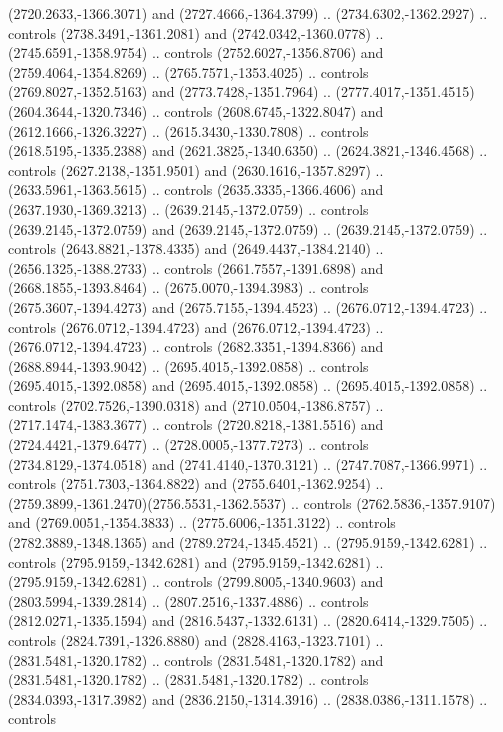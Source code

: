 \begin{scope}[shift={(28.3138,-376.6591)}]
\begin{scope}[shift={(-2186.6262,1813.8454)}]
      (2720.2633,-1366.3071) and (2727.4666,-1364.3799) .. (2734.6302,-1362.2927) ..
      controls (2738.3491,-1361.2081) and (2742.0342,-1360.0778) ..
      (2745.6591,-1358.9754) .. controls (2752.6027,-1356.8706) and
      (2759.4064,-1354.8269) .. (2765.7571,-1353.4025) .. controls
      (2769.8027,-1352.5163) and (2773.7428,-1351.7964) ..
      (2777.4017,-1351.4515)(2604.3644,-1320.7346) .. controls
      (2608.6745,-1322.8047) and (2612.1666,-1326.3227) .. (2615.3430,-1330.7808) ..
      controls (2618.5195,-1335.2388) and (2621.3825,-1340.6350) ..
      (2624.3821,-1346.4568) .. controls (2627.2138,-1351.9501) and
      (2630.1616,-1357.8297) .. (2633.5961,-1363.5615) .. controls
      (2635.3335,-1366.4606) and (2637.1930,-1369.3213) .. (2639.2145,-1372.0759) ..
      controls (2639.2145,-1372.0759) and (2639.2145,-1372.0759) ..
      (2639.2145,-1372.0759) .. controls (2643.8821,-1378.4335) and
      (2649.4437,-1384.2140) .. (2656.1325,-1388.2733) .. controls
      (2661.7557,-1391.6898) and (2668.1855,-1393.8464) .. (2675.0070,-1394.3983) ..
      controls (2675.3607,-1394.4273) and (2675.7155,-1394.4523) ..
      (2676.0712,-1394.4723) .. controls (2676.0712,-1394.4723) and
      (2676.0712,-1394.4723) .. (2676.0712,-1394.4723) .. controls
      (2682.3351,-1394.8366) and (2688.8944,-1393.9042) .. (2695.4015,-1392.0858) ..
      controls (2695.4015,-1392.0858) and (2695.4015,-1392.0858) ..
      (2695.4015,-1392.0858) .. controls (2702.7526,-1390.0318) and
      (2710.0504,-1386.8757) .. (2717.1474,-1383.3677) .. controls
      (2720.8218,-1381.5516) and (2724.4421,-1379.6477) .. (2728.0005,-1377.7273) ..
      controls (2734.8129,-1374.0518) and (2741.4140,-1370.3121) ..
      (2747.7087,-1366.9971) .. controls (2751.7303,-1364.8822) and
      (2755.6401,-1362.9254) .. (2759.3899,-1361.2470)(2756.5531,-1362.5537) ..
      controls (2762.5836,-1357.9107) and (2769.0051,-1354.3833) ..
      (2775.6006,-1351.3122) .. controls (2782.3889,-1348.1365) and
      (2789.2724,-1345.4521) .. (2795.9159,-1342.6281) .. controls
      (2795.9159,-1342.6281) and (2795.9159,-1342.6281) .. (2795.9159,-1342.6281) ..
      controls (2799.8005,-1340.9603) and (2803.5994,-1339.2814) ..
      (2807.2516,-1337.4886) .. controls (2812.0271,-1335.1594) and
      (2816.5437,-1332.6131) .. (2820.6414,-1329.7505) .. controls
      (2824.7391,-1326.8880) and (2828.4163,-1323.7101) .. (2831.5481,-1320.1782) ..
      controls (2831.5481,-1320.1782) and (2831.5481,-1320.1782) ..
      (2831.5481,-1320.1782) .. controls (2834.0393,-1317.3982) and
      (2836.2150,-1314.3916) .. (2838.0386,-1311.1578) .. controls

\end{scope}
\end{scope}
